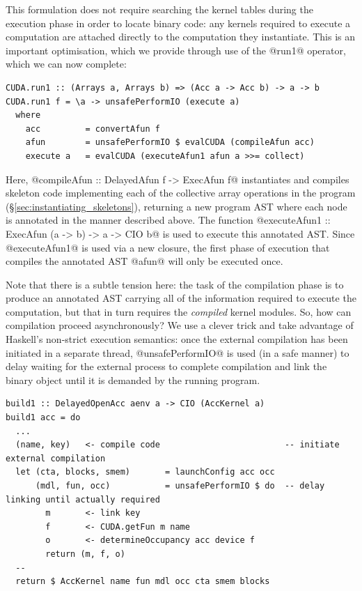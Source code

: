 This formulation does not require searching the kernel tables during the
execution phase in order to locate binary code: any kernels required to execute
a computation are attached directly to the computation they instantiate. This is
an important optimisation, which we provide through use of the @run1@
operator, which we can now complete:
%
\begin{lstlisting}[style=haskell]
CUDA.run1 :: (Arrays a, Arrays b) => (Acc a -> Acc b) -> a -> b
CUDA.run1 f = \a -> unsafePerformIO (execute a)
  where
    acc         = convertAfun f
    afun        = unsafePerformIO $ evalCUDA (compileAfun acc)
    execute a   = evalCUDA (executeAfun1 afun a >>= collect)
\end{lstlisting}
%
Here, @compileAfun :: DelayedAfun f -> ExecAfun f@ instantiates and
compiles skeleton code implementing each of the collective array operations in
the program (\S\ref{sec:instantiating_skeletons}), returning a new program AST
where each node is annotated in the manner described above. The function
@executeAfun1 :: ExecAfun (a -> b) -> a -> CIO b@ is used to execute this
annotated AST\@. Since @executeAfun1@ is used via a new closure, the first phase
of execution that compiles the annotated AST @afun@ will only be executed once.

Note that there is a subtle tension here: the task of the compilation phase is
to produce an annotated AST carrying all of the information required to execute
the computation, but that in turn requires the \emph{compiled} kernel modules.
So, how can compilation proceed asynchronously? We use a clever trick and take
advantage of Haskell's non-strict execution semantics: once the external
compilation has been initiated in a separate thread, @unsafePerformIO@ is
used (in a safe manner) to delay waiting for the external process to complete
compilation and link the binary object until it is demanded by the running
program. 
%
\begin{lstlisting}[style=haskell]
build1 :: DelayedOpenAcc aenv a -> CIO (AccKernel a)
build1 acc = do
  ...
  (name, key)   <- compile code                         -- initiate external compilation
  let (cta, blocks, smem)       = launchConfig acc occ
      (mdl, fun, occ)           = unsafePerformIO $ do  -- delay linking until actually required
        m       <- link key
        f       <- CUDA.getFun m name
        o       <- determineOccupancy acc device f
        return (m, f, o)
  --
  return $ AccKernel name fun mdl occ cta smem blocks
\end{lstlisting}


